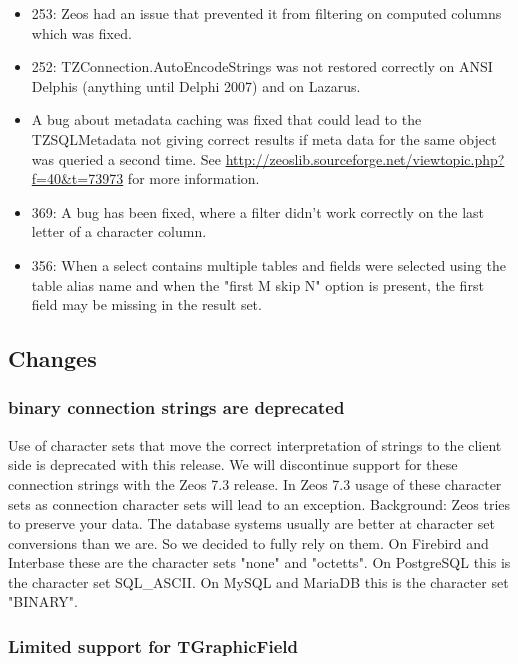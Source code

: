 \documentclass[a4paper,12pt,oneside]{book}
\begin{document}
\begin{itemize}
\item 253: Zeos had an issue that prevented it from filtering on computed columns which was fixed.
\item 252: TZConnection.AutoEncodeStrings was not restored correctly on ANSI Delphis (anything until Delphi 2007) and on Lazarus.
\item 	
  A bug about metadata caching was fixed that could lead to the TZSQLMetadata not giving correct results if meta data for the same object was queried a second time.
	See \url{http://zeoslib.sourceforge.net/viewtopic.php?f=40&t=73973} for more information.
\item
  369:
	A bug has been fixed, where a filter didn't work correctly on the last letter of a character column.
\item
  356:
	When a select contains multiple tables and fields were selected using the table alias name and when the "first M skip N" option is present, the first field may be missing in the result set. 
\end{itemize}

\subsection{Changes}
\label{sec:Rev6_General_Changes}

\subsubsection{binary connection strings are deprecated}
\label{sec:Rev6_General_Changes_BinaryConnectonStringsDeprecated}

Use of character sets that move the correct interpretation of strings to the client side is deprecated with this release.
We will discontinue support for these connection strings with the Zeos 7.3 release.
In Zeos 7.3 usage of these character sets as connection character sets will lead to an exception.
Background:
Zeos tries to preserve your data.
The database systems usually are better at character set conversions than we are.
So we decided to fully rely on them.
On Firebird and Interbase these are the character sets "none" and "octetts".
On PostgreSQL this is the character set SQL\_ASCII.
On MySQL and MariaDB this is the character set "BINARY".

\subsubsection{Limited support for TGraphicField}
\label{sec:Rev6_General_Changes_TGrapgicField}
\end{document}
